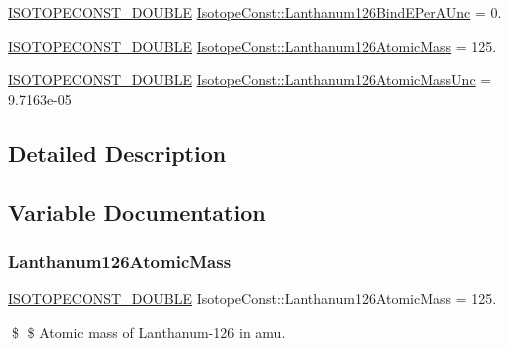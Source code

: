 \begin{DoxyCompactItemize}
\mbox{\hyperlink{group___isotope_const-_macros_ga8f45a7272ce02c0b4c65c44636ed719a}{I\+S\+O\+T\+O\+P\+E\+C\+O\+N\+S\+T\+\_\+\+D\+O\+U\+B\+LE}} \mbox{\hyperlink{group___isotope_const-_lanthanum-_la126_ga898b429cfd95189bdcbc55853f1269b3}{Isotope\+Const\+::\+Lanthanum126\+Bind\+E\+Per\+A\+Unc}} = 0.
\item 
\mbox{\hyperlink{group___isotope_const-_macros_ga8f45a7272ce02c0b4c65c44636ed719a}{I\+S\+O\+T\+O\+P\+E\+C\+O\+N\+S\+T\+\_\+\+D\+O\+U\+B\+LE}} \mbox{\hyperlink{group___isotope_const-_lanthanum-_la126_ga18521899c7afa251aff23ce1aa32ba00}{Isotope\+Const\+::\+Lanthanum126\+Atomic\+Mass}} = 125.
\item 
\mbox{\hyperlink{group___isotope_const-_macros_ga8f45a7272ce02c0b4c65c44636ed719a}{I\+S\+O\+T\+O\+P\+E\+C\+O\+N\+S\+T\+\_\+\+D\+O\+U\+B\+LE}} \mbox{\hyperlink{group___isotope_const-_lanthanum-_la126_gac894c7900fbb45d5e925f4d8fc655582}{Isotope\+Const\+::\+Lanthanum126\+Atomic\+Mass\+Unc}} = 9.\+7163e-\/05
\end{DoxyCompactItemize}


\subsection{Detailed Description}


\subsection{Variable Documentation}
\mbox{\label{group___isotope_const-_lanthanum-_la126_ga18521899c7afa251aff23ce1aa32ba00}} 
\subsubsection{\texorpdfstring{Lanthanum126\+Atomic\+Mass}{Lanthanum126AtomicMass}}
{\footnotesize\ttfamily \mbox{\hyperlink{group___isotope_const-_macros_ga8f45a7272ce02c0b4c65c44636ed719a}{I\+S\+O\+T\+O\+P\+E\+C\+O\+N\+S\+T\+\_\+\+D\+O\+U\+B\+LE}} Isotope\+Const\+::\+Lanthanum126\+Atomic\+Mass = 125.}

\$ \$ Atomic mass of Lanthanum-\/126 in amu. \mbox{\label{group___isotope_const-_lanthanum-_la126_gac894c7900fbb45d5e925f4d8fc655582}} 
